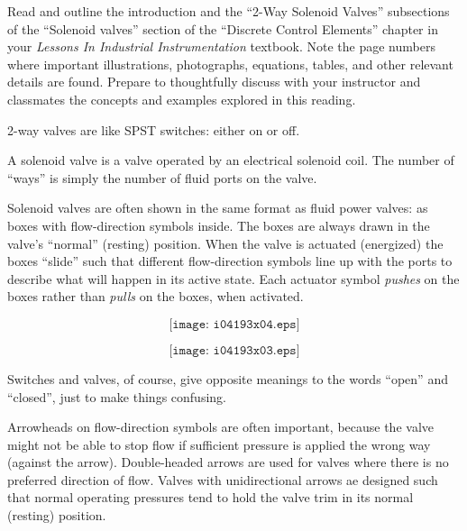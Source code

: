 

Read and outline the introduction and the ``2-Way Solenoid Valves'' subsections of the ``Solenoid valves'' section of the ``Discrete Control Elements'' chapter in your {\it Lessons In Industrial Instrumentation} textbook.  Note the page numbers where important illustrations, photographs, equations, tables, and other relevant details are found.  Prepare to thoughtfully discuss with your instructor and classmates the concepts and examples explored in this reading.













2-way valves are like SPST switches: either on or off.

\vskip 10pt

A solenoid valve is a valve operated by an electrical solenoid coil.  The number of ``ways'' is simply the number of fluid ports on the valve.

\vskip 10pt

Solenoid valves are often shown in the same format as fluid power valves: as boxes with flow-direction symbols inside.  The boxes are always drawn in the valve's ``normal'' (resting) position.  When the valve is actuated (energized) the boxes ``slide'' such that different flow-direction symbols line up with the ports to describe what will happen in its active state.  Each actuator symbol {\it pushes} on the boxes rather than {\it pulls} on the boxes, when activated.

$$\texttt{[image: i04193x04.eps]}$$

$$\texttt{[image: i04193x03.eps]}$$

Switches and valves, of course, give opposite meanings to the words ``open'' and ``closed'', just to make things confusing.

\vskip 10pt

Arrowheads on flow-direction symbols are often important, because the valve might not be able to stop flow if sufficient pressure is applied the wrong way (against the arrow).  Double-headed arrows are used for valves where there is no preferred direction of flow.  Valves with unidirectional arrows ae designed such that normal operating pressures tend to hold the valve trim in its normal (resting) position.








